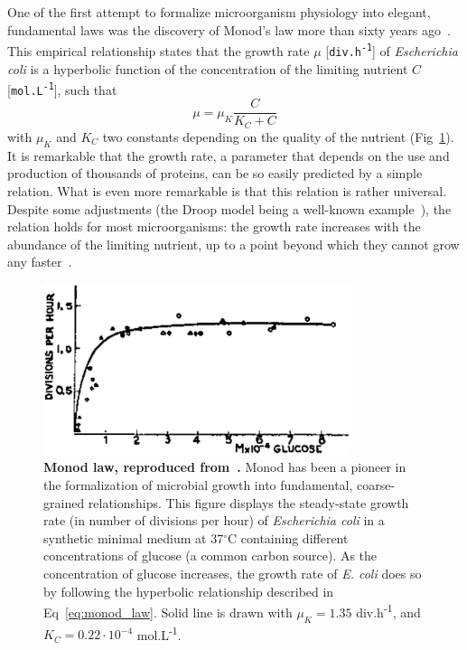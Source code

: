 One of the first attempt to formalize microorganism physiology into elegant, fundamental laws was the discovery of Monod's law more than sixty years ago~\cite{monod_growth_1949}.
This empirical relationship states that the growth rate $\mu$ [\texttt{div.h\textsuperscript{-1}}] of \textit{Escherichia coli} is a hyperbolic function of the concentration of the limiting nutrient $C$ [\texttt{mol.L\textsuperscript{-1}}], such that
\begin{equation}
\label{eq:monod_law}
\mu = \mu_K \frac{C}{K_C + C}
\end{equation}
with $\mu_K$ and $K_C$ two constants depending on the quality of the nutrient (Fig~\ref{fig:monod_law}).
It is remarkable that the growth rate, a parameter that depends on the use and production of thousands of proteins, can be so easily predicted by a simple relation.
What is even more remarkable is that this relation is rather universal.
Despite some adjustments (the Droop model being a well-known example~\cite{droop_thoughts_1973}), the relation holds for most microorganisms: the growth rate increases with the abundance of the limiting nutrient, up to a point beyond which they cannot grow any faster~\cite{koch_why_1988}.

\begin{figure}[tb]
\centering
\includegraphics[height=5cm]{./Fig/Chapter1/monod_law.eps}
\caption{
\textbf{Monod law, reproduced from~\cite{monod_growth_1949}.}
Monod has been a pioneer in the formalization of microbial growth into fundamental, coarse-grained relationships.
This figure displays the steady-state growth rate (in number of divisions per hour) of \textit{Escherichia coli} in a synthetic minimal medium at 37$^{\circ}$C containing different concentrations of glucose (a common carbon source).
As the concentration of glucose increases, the growth rate of \textit{E. coli} does so by following the hyperbolic relationship described in Eq~\ref{eq:monod_law}.
Solid line is drawn with $\mu_K = 1.35$ div.h\textsuperscript{-1}, and $K_C = 0.22 \cdot 10^{-4}$ mol.L\textsuperscript{-1}.
}
\label{fig:monod_law}
\end{figure}


